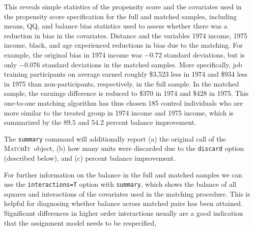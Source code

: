 \documentclass[oneside,letterpaper,titlepage]{article}
\newcommand{\MatchIt}{\textsc{MatchIt}}
\begin{document}
This reveals simple statistics of the propensity score and the
covariates used in the propensity score specification for the full and
matched samples, including means, QQ, and balance bias statistics used
to assess whether there was a reduction in bias in the covariates.
Distance and the variables 1974 income, 1975 income, black, and age
experienced reductions in bias due to the matching.  For example, the
original bias in 1974 income was $-0.72$ standard deviations, but is
only $-0.076$ standard deviations in the matched samples.  More
specifically, job training participants on average earned roughly
\$3,523 less in 1974 and \$934 less in 1975 than non-participants,
respectively, in the full sample.  In the matched sample, the earnings
difference is reduced to \$370 in 1974 and \$428 in 1975.  This
one-to-one matching algorithm has thus chosen 185 control individuals
who are more similar to the treated group in 1974 income and 1975
income, which is summarized by the $89.5$ and $54.2$ percent
balance improvement. 

The \texttt{summary} command will additionally report (a) the original
call of the \MatchIt\ object, (b) how many units were discarded due
to the \texttt{discard} option (described below), and (c) percent
balance improvement.  

For further information on the balance in the full and matched samples
we can use the {\tt interactions=T} option with {\tt summary}, which
shows the balance of all squares and interactions of the covariates
used in the matching procedure.  This is helpful for diagnosing
whether balance across matched pairs has been attained.  Significant
differences in higher order interactions usually are a good indication
that the assignment model needs to be respecified, %
\end{document}
